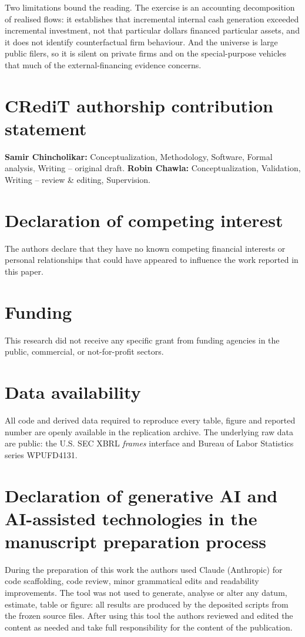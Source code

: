 \documentclass[preprint,11pt]{elsarticle}
\begin{document}
Two limitations bound the reading. The exercise is an accounting decomposition of realised flows: it
establishes that incremental internal cash generation exceeded incremental investment, not that
particular dollars financed particular assets, and it does not identify counterfactual firm
behaviour. And the universe is large public filers, so it is silent on private firms and on the
special-purpose vehicles that much of the external-financing evidence concerns.

\section*{CRediT authorship contribution statement}
\textbf{Samir Chincholikar:} Conceptualization, Methodology, Software, Formal analysis,
Writing -- original draft. \textbf{Robin Chawla:} Conceptualization, Validation, Writing --
review \& editing, Supervision.

\section*{Declaration of competing interest}
The authors declare that they have no known competing financial interests or personal
relationships that could have appeared to influence the work reported in this paper.

\section*{Funding}
This research did not receive any specific grant from funding agencies in the public,
commercial, or not-for-profit sectors.

\section*{Data availability}
All code and derived data required to reproduce every table, figure and reported number are
openly available in the replication archive. The underlying raw data are public: the U.S. SEC
XBRL \emph{frames} interface and Bureau of Labor Statistics series WPUFD4131.

\section*{Declaration of generative AI and AI-assisted technologies in the manuscript preparation process}
During the preparation of this work the authors used Claude (Anthropic) for code scaffolding, code
review, minor grammatical edits and readability improvements. The tool was not used to generate,
analyse or alter any datum, estimate, table or figure: all results are produced by the deposited
scripts from the frozen source files. After using this tool the authors reviewed and edited the
content as needed and take full responsibility for the content of the publication.
\end{document}
